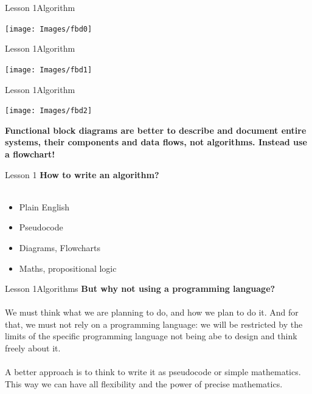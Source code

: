 \documentclass[aspectratio=1610]{beamer}
\begin{document}
\begin{frame}{Lesson 1}{Algorithm}
\begin{center}
	\texttt{[image: Images/fbd0]}
\end{center}
\end{frame}


\begin{frame}{Lesson 1}{Algorithm}
\begin{center}
	\texttt{[image: Images/fbd1]}
\end{center}
\end{frame}


\begin{frame}{Lesson 1}{Algorithm}
\begin{center}
	\texttt{[image: Images/fbd2]}
\end{center}
\end{frame}


\begin{frame}
\begin{center}
\Huge 
\textbf {Functional block diagrams are better to describe and document entire systems, their components and data flows, not algorithms. Instead use a flowchart!}
\end{center}
\end{frame}


\begin{frame}{Lesson 1}{}
\LARGE
\textbf{How to write an algorithm?}\\~\\
\begin{itemize}
	\item Plain English
	\item Pseudocode
	\item Diagrams, Flowcharts
	\item Maths, propositional logic
\end{itemize}
\end{frame}


\begin{frame}{Lesson 1}{Algorithms}
\Large
\textbf{But why not using a programming language?}\\~\\ 
We must think what we are planning to do, and how we plan to do it. And for that, we must not rely on a programming language: we will be restricted by the limits of the specific programming language not being abe to design and think freely about it.\\~\\
A better approach is to think to write it as pseudocode or simple mathematics. This way we can have all flexibility and the power of precise mathematics.
\end{frame}
\end{document}
